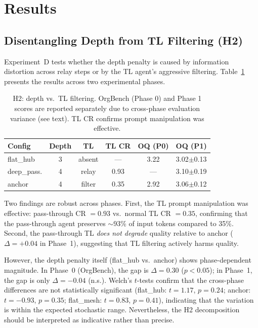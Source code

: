 \documentclass[conference]{IEEEtran}
\begin{document}
\section{Results}
\label{sec:results}

\subsection{Disentangling Depth from TL Filtering (H2)}
\label{subsec:h2_result}

Experiment~D tests whether the depth penalty is caused by information distortion across relay steps or by the TL agent's aggressive filtering.
Table~\ref{tab:h2} presents the results across two experimental phases.

\begin{table}[t]
\centering
\caption{H2: depth vs.\ TL filtering. OrgBench (Phase 0) and Phase 1 scores are reported separately due to cross-phase evaluation variance (see text). TL CR confirms prompt manipulation was effective.}
\label{tab:h2}
\small
\begin{tabular}{lccccc}
\toprule
\textbf{Config} & \textbf{Depth} & \textbf{TL} & \textbf{TL CR} & \textbf{OQ (P0)} & \textbf{OQ (P1)} \\
\midrule
flat\_hub & 3 & absent & --- & 3.22 & 3.02$\pm$0.13 \\
deep\_pass. & 4 & relay & 0.93 & --- & 3.10$\pm$0.19 \\
anchor & 4 & filter & 0.35 & 2.92 & 3.06$\pm$0.12 \\
\bottomrule
\end{tabular}
\end{table}

Two findings are robust across phases.
First, the TL prompt manipulation was effective: pass-through CR $= 0.93$ vs.\ normal TL CR $= 0.35$, confirming that the pass-through agent preserves $\sim$93\% of input tokens compared to 35\%.
Second, the pass-through TL \emph{does not degrade} quality relative to anchor ($\Delta = +0.04$ in Phase~1), suggesting that TL filtering actively harms quality.

However, the depth penalty itself (flat\_hub vs.\ anchor) shows phase-dependent magnitude.
In Phase~0 (OrgBench), the gap is $\Delta = 0.30$ ($p < 0.05$); in Phase~1, the gap is only $\Delta = -0.04$ (n.s.).
Welch's $t$-tests confirm that the cross-phase differences are not statistically significant (flat\_hub: $t = 1.17$, $p = 0.24$; anchor: $t = -0.93$, $p = 0.35$; flat\_mesh: $t = 0.83$, $p = 0.41$), indicating that the variation is within the expected stochastic range.
Nevertheless, the H2 decomposition should be interpreted as indicative rather than precise.
\end{document}
